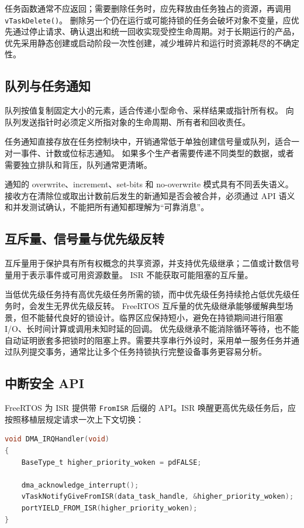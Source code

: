 任务函数通常不应返回；需要删除任务时，应先释放由任务独占的资源，再调用 \texttt{vTaskDelete()}。
删除另一个仍在运行或可能持锁的任务会破坏对象不变量，应优先通过停止请求、确认退出和统一回收实现受控生命周期。对于长期运行的产品，优先采用静态创建或启动阶段一次性创建，减少堆碎片和运行时资源耗尽的不确定性。

\subsection{队列与任务通知}

队列按值复制固定大小的元素，适合传递小型命令、采样结果或指针所有权。
向队列发送指针时必须定义所指对象的生命周期、所有者和回收责任。

任务通知直接存放在任务控制块中，开销通常低于单独创建信号量或队列，适合一对一事件、计数或位标志通知。
如果多个生产者需要传递不同类型的数据，或者需要独立排队和背压，队列通常更清晰。

通知的 overwrite、increment、set-bits 和 no-overwrite 模式具有不同丢失语义。接收方在清除位或取出计数前后发生的新通知是否会被合并，必须通过 API 语义和并发测试确认，不能把所有通知都理解为“可靠消息”。

\subsection{互斥量、信号量与优先级反转}

互斥量用于保护具有所有权概念的共享资源，并支持优先级继承；二值或计数信号量用于表示事件或可用资源数量。
ISR 不能获取可能阻塞的互斥量。

当低优先级任务持有高优先级任务所需的锁，而中优先级任务持续抢占低优先级任务时，会发生无界优先级反转。
FreeRTOS 互斥量的优先级继承能够缓解典型场景，但不能替代良好的锁设计。临界区应保持短小，避免在持锁期间进行阻塞 I/O、长时间计算或调用未知时延的回调。
优先级继承不能消除循环等待，也不能自动证明嵌套多把锁时的阻塞上界。需要共享串行外设时，采用单一服务任务并通过队列提交事务，通常比让多个任务持锁执行完整设备事务更容易分析。

\subsection{中断安全 API}

FreeRTOS 为 ISR 提供带 \texttt{FromISR} 后缀的 API。ISR 唤醒更高优先级任务后，应按照移植层规定请求一次上下文切换：

\begin{lstlisting}[language=C]
void DMA_IRQHandler(void)
{
    BaseType_t higher_priority_woken = pdFALSE;

    dma_acknowledge_interrupt();
    vTaskNotifyGiveFromISR(data_task_handle, &higher_priority_woken);
    portYIELD_FROM_ISR(higher_priority_woken);
}
\end{lstlisting}

